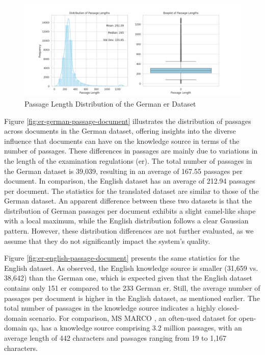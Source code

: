 \begin{figure}
    \centering
    \includegraphics[width=\textwidth]{Grafiken/Statistiken/IndexGerman_Passage_Length_Statistics.png}
    \caption{Passage Length Distribution of the German \gls{er} Dataset}
    \label{fig:er-german-passage-length}
\end{figure}
Figure \ref{fig:er-german-passage-document} illustrates the distribution of passages across documents in the German dataset, offering insights into the diverse influence that documents can have on the knowledge source in terms of the number of passages. These differences in passages are mainly due to variations in the length of the examination regulations (\gls{er}). The total number of passages in the German dataset is 39,039, resulting in an average of 167.55 passages per document. In comparison, the English dataset has an average of 212.94 passages per document. The statistics for the translated dataset are similar to those of the German dataset. An apparent difference between these two datasets is that the distribution of German passages per document exhibits a slight camel-like shape with a local maximum, while the English distribution follows a clear Gaussian pattern. However, these distribution differences are not further evaluated, as we assume that they do not significantly impact the system's quality.

Figure \ref{fig:er-english-passage-document} presents the same statistics for the English dataset. As observed, the English knowledge source is smaller (31,659 vs. 38,642) than the German one, which is expected given that the English dataset contains only 151 \gls{er} compared to the 233 German \gls{er}. Still, the average number of passages per document is higher in the English dataset, as mentioned earlier. The total number of passages in the knowledge source indicates a highly closed-domain scenario. For comparison, MS MARCO \cite{bajaj2016ms}, an often-used dataset for open-domain \gls{qa}, has a knowledge source comprising 3.2 million passages, with an average length of 442 characters and passages ranging from 19 to 1,167 characters.

